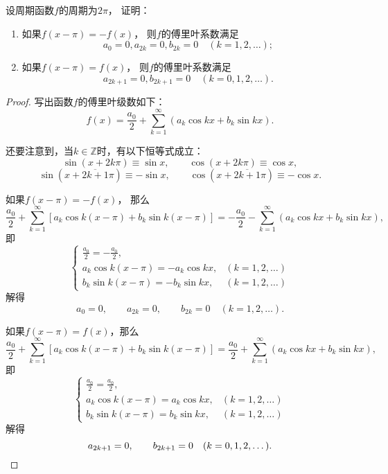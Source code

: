 \begin{example}
设周期函数\(f\)的周期为\(2\pi\)，
证明：\begin{enumerate}
\item 如果\(f(x-\pi) = -f(x)\)，
则\(f\)的傅里叶系数满足\[
	a_0 = 0,
	a_{2k} = 0,
	b_{2k} = 0
	\quad(k=1,2,\dotsc);
\]
\item 如果\(f(x-\pi) = f(x)\)，
则\(f\)的傅里叶系数满足\[
	a_{2k+1} = 0,
	b_{2k+1} = 0
	\quad(k=0,1,2,\dotsc).
\]
\end{enumerate}
\begin{proof}
写出函数\(f\)的傅里叶级数如下：\[
	f(x) = \frac{a_0}{2}
	+ \sum_{k=1}^\infty \left(
		a_k \cos kx
		+ b_k \sin kx
	\right).
\]

还要注意到，当\(k\in\mathbb{Z}\)时，有以下恒等式成立：\[
	\sin(x+2k\pi) \equiv \sin x, \qquad
	\cos(x+2k\pi) \equiv \cos x,
\]\[
	\sin(x+\overline{2k+1}\pi) \equiv -\sin x, \qquad
	\cos(x+\overline{2k+1}\pi) \equiv -\cos x.
\]

如果\(f(x-\pi) = -f(x)\)，
那么\[
	\frac{a_0}{2} + \sum_{k=1}^\infty \left[
		a_k \cos k(x-\pi)
		+ b_k \sin k(x-\pi)
	\right]
	=
	-\frac{a_0}{2} - \sum_{k=1}^\infty \left(
		a_k \cos kx
		+ b_k \sin kx
	\right),
\]
即\[
	\left\{ \begin{array}{ll}
		\frac{a_0}{2} = -\frac{a_0}{2}, \\
		a_k \cos k(x-\pi) = - a_k \cos kx, &(k=1,2,\dotsc) \\
		b_k \sin k(x-\pi) = - b_k \sin kx, &(k=1,2,\dotsc)
	\end{array} \right.
\]
解得\[
	a_0 = 0, \qquad
	a_{2k} = 0, \qquad
	b_{2k} = 0
	\quad(k=1,2,\dotsc).
\]

如果\(f(x-\pi) = f(x)\)，那么\[
	\frac{a_0}{2} + \sum_{k=1}^\infty \left[
		a_k \cos k(x-\pi)
		+ b_k \sin k(x-\pi)
	\right]
	=
	\frac{a_0}{2} + \sum_{k=1}^\infty \left(
		a_k \cos kx
		+ b_k \sin kx
	\right),
\]
即\[
	\left\{ \begin{array}{ll}
		\frac{a_0}{2} = \frac{a_0}{2}, \\
		a_k \cos k(x-\pi) = a_k \cos kx, &(k=1,2,\dotsc) \\
		b_k \sin k(x-\pi) = b_k \sin kx, &(k=1,2,\dotsc)
	\end{array} \right.
\]
解得\[
	a_{2k+1} = 0, \qquad
	b_{2k+1} = 0
	\quad(k=0,1,2,\dotsc).
	\qedhere
\]
\end{proof}
\end{example}
